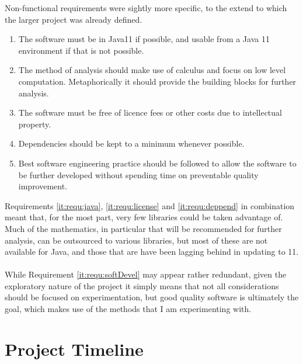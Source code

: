 \documentclass[main.tex]{subfiles}
\begin{document}
    Non-functional requirements were sightly more specific, to the extend to which the larger project was already defined.
    
    \begin{enumerate}
      \item \label{it:requ:java} The software must be in Java11 if possible, and usable from a Java 11 environment if that is not possible.
      \item \label{it:requ:calculus} The method of analysis should make use of calculus and focus on low level computation. Metaphorically it should provide the building blocks for further analysis.
      \item \label{it:requ:license} The software must be free of licence fees or other costs due to intellectual property.
      \item \label{it:requ:deppend} Dependencies should be kept to a minimum whenever possible.
      \item \label{it:requ:softDevel} Best software engineering practice should be followed to allow the software to be further developed without spending time on preventable quality improvement.        
    \end{enumerate}
    
    Requirements \ref{it:requ:java}, \ref{it:requ:license} and \ref{it:requ:deppend} in combination meant that, for the most part, very few  libraries could be taken advantage of. Much of the mathematics, in particular that will be recommended for further analysis, can be outsourced to various libraries, but most of these are not available for Java, and those that are have been lagging behind in updating to 11. 
    \\\\
    While Requirement \ref{it:requ:softDevel} may appear rather redundant, given the exploratory nature of the project it simply means that not all considerations should be focused on experimentation, but good quality software is ultimately the goal, which makes use of the methods that I am experimenting with.
    
  \section{Project Timeline}
    
\end{document}
